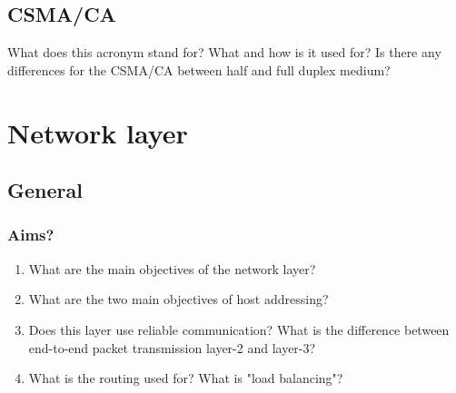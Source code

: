 \documentclass[11pt]{article}
\begin{document}
\subsection{CSMA/CA}
What does this acronym stand for? What and how is it used for? Is there any differences for the CSMA/CA between half and full duplex medium?

\pagebreak
\section{Network layer}
\subsection{General}
\subsubsection{Aims?}
\begin{enumerate}
  \item What are the main objectives of the network layer?
  \item What are the two main objectives of host addressing?
  \item Does this layer use reliable communication? What is the difference between end-to-end packet transmission layer-2 and layer-3?
  \item What is the routing used for? What is "load balancing"?
\end{enumerate}
\end{document}
